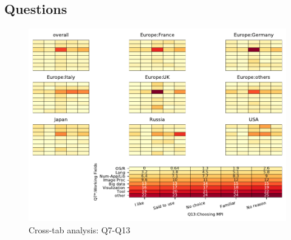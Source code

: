 
\subsection{Questions}


\begin{figure}
\begin{center}
\includegraphics[width=12cm]{../pdfs/Q7-Q13.pdf}
\caption{Cross-tab analysis: Q7-Q13}
\label{fig:Q7-Q13}
\end{center}
\end{figure}
